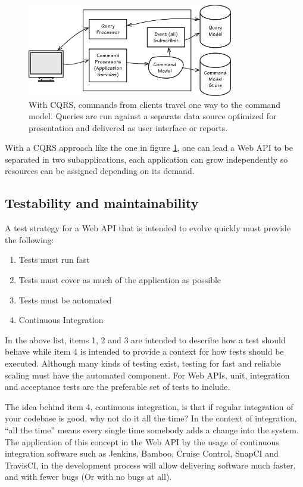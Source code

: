 \documentclass[10pt,article]{IEEEtran}
\begin{document}
\begin{figure}[h]
    \centering
    \includegraphics[width=9cm]{cqrs}
    \caption{With CQRS, commands from clients travel one way to the command model. Queries are run against a separate data source optimized for presentation and delivered as user interface or reports\cite{vernon:iddd}.}
    \label{fig:cqrs}
\end{figure}

With a CQRS approach like the one in figure \ref{fig:cqrs}, one can lead a Web API to be separated in two subapplications, each application can grow independently so resources can be assigned depending on its demand. 

\subsection{Testability and maintainability}
A test strategy for a Web API that is intended to evolve quickly must provide the following:
\begin{enumerate}
    \item
    Tests must run fast
    \item
    Tests must cover as much of the application as possible
    \item
    Tests must be automated
    \item
    Continuous Integration
\end{enumerate}

In the above list, items 1, 2 and 3 are intended to describe how a test should behave while item 4 is intended to provide a context for how tests should be executed. Although many kinds of testing exist\cite{humble}, testing for fast and reliable scaling must have the automated component. For Web APIs, unit, integration and acceptance tests are the preferable set of tests to include.

The idea behind item 4, continuous integration, is that if regular integration of your codebase is good, why not do it all the time? In the context of integration, ``all the time'' means every single time somebody adds a change into the system\cite{beck:ci}. The application of this concept in the Web API by the usage of continuous integration software such as Jenkins, Bamboo, Cruise Control, SnapCI and TravisCI, in the development process will allow delivering software much faster, and with fewer bugs (Or with no bugs at all). 
\end{document}
